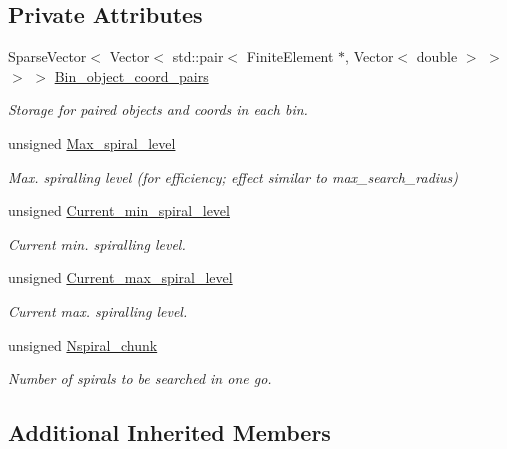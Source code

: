\subsection*{Private Attributes}
\begin{DoxyCompactItemize}
\item 
Sparse\+Vector$<$ Vector$<$ std\+::pair$<$ Finite\+Element $\ast$, Vector$<$ double $>$ $>$ $>$ $>$ \hyperlink{classNonRefineableBinArray_aab1a7f3687936a21af92124a4ae7bd86}{Bin\+\_\+object\+\_\+coord\+\_\+pairs}
\begin{DoxyCompactList}\small\item\em Storage for paired objects and coords in each bin. \end{DoxyCompactList}\item 
unsigned \hyperlink{classNonRefineableBinArray_a13dae71565c22468fa49cc91cd66ae04}{Max\+\_\+spiral\+\_\+level}
\begin{DoxyCompactList}\small\item\em Max. spiralling level (for efficiency; effect similar to max\+\_\+search\+\_\+radius) \end{DoxyCompactList}\item 
unsigned \hyperlink{classNonRefineableBinArray_a2bcdae813c2cf3bd8d319149755e1d7a}{Current\+\_\+min\+\_\+spiral\+\_\+level}
\begin{DoxyCompactList}\small\item\em Current min. spiralling level. \end{DoxyCompactList}\item 
unsigned \hyperlink{classNonRefineableBinArray_a4cc397e661be3130014df3f634a0e92a}{Current\+\_\+max\+\_\+spiral\+\_\+level}
\begin{DoxyCompactList}\small\item\em Current max. spiralling level. \end{DoxyCompactList}\item 
unsigned \hyperlink{classNonRefineableBinArray_a0f3b174a09336f9e941813a09f11b866}{Nspiral\+\_\+chunk}
\begin{DoxyCompactList}\small\item\em Number of spirals to be searched in one go. \end{DoxyCompactList}\end{DoxyCompactItemize}
\subsection*{Additional Inherited Members}


